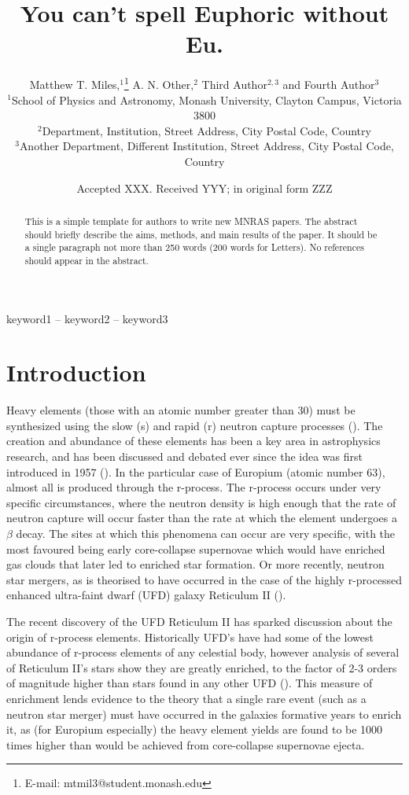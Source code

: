 \documentclass[a4paper,fleqn,usenatbib]{mnras}
\title[Research is fun, max. 45 characters]{You can't spell Euphoric without Eu.}
\author[Matthew T. Miles et al.]{
Matthew T. Miles,$^{1}$\thanks{E-mail: mtmil3@student.monash.edu}
A. N. Other,$^{2}$
Third Author$^{2,3}$
and Fourth Author$^{3}$
\\
$^{1}$School of Physics and Astronomy, Monash University, Clayton Campus, Victoria 3800\\
$^{2}$Department, Institution, Street Address, City Postal Code, Country\\
$^{3}$Another Department, Different Institution, Street Address, City Postal Code, Country
}
\date{Accepted XXX. Received YYY; in original form ZZZ}
\begin{document}
\label{firstpage}
\pagerange{\pageref{firstpage}--\pageref{lastpage}}
\maketitle

\begin{abstract}
This is a simple template for authors to write new MNRAS papers.
The abstract should briefly describe the aims, methods, and main results of the paper.
It should be a single paragraph not more than 250 words (200 words for Letters).
No references should appear in the abstract.
\end{abstract}

\begin{keywords}
keyword1 -- keyword2 -- keyword3
\end{keywords}


\section{Introduction}



Heavy elements (those with an atomic number greater than 30) must be synthesized using the slow (s) and rapid (r) neutron capture processes (\cite{Sneden2008}). The creation and abundance of these elements has been a key area in astrophysics research, and has been discussed and debated ever since the idea was first introduced in 1957 (\cite{Burbidge1957}). In the particular case of Europium (atomic number 63), almost all is produced through the r-process. The r-process occurs under very specific circumstances, where the neutron density is high enough that the rate of neutron capture will occur faster than the rate at which the element undergoes a $\beta$ decay. The sites at which this phenomena can occur are very specific, with the most favoured being early core-collapse supernovae which would have enriched gas clouds that later led to enriched star formation. Or more recently, neutron star mergers, as is theorised to have occurred in the case of the highly r-processed enhanced ultra-faint dwarf (UFD) galaxy Reticulum II (\cite{Ji2016}).

The recent discovery of the UFD Reticulum II has sparked discussion about the origin of r-process elements. Historically UFD's have had some of the lowest abundance of r-process elements of any celestial body, however analysis of several of Reticulum II's stars show they are greatly enriched, to the factor of 2-3 orders of magnitude higher than stars found in any other UFD (\cite{Ji2016}). This measure of enrichment lends evidence to the theory that a single rare event (such as a neutron star merger) must have occurred in the galaxies formative years to enrich it, as (for Europium especially) the heavy element yields are found to be 1000 times higher than would be achieved from core-collapse supernovae ejecta. 
\end{document}

